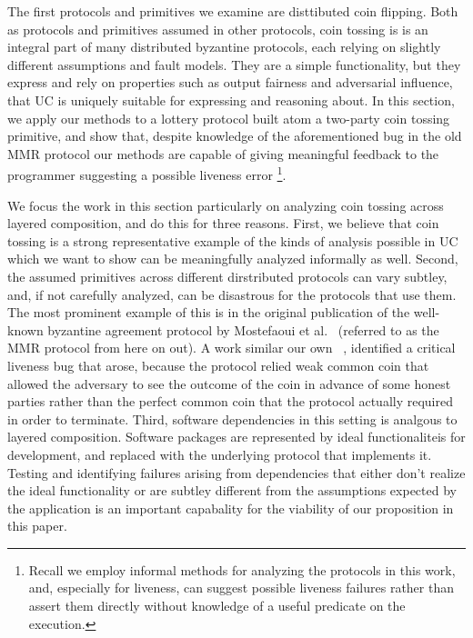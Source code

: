 The first protocols and primitives we examine are disttibuted coin flipping. 
Both as protocols and primitives assumed in other protocols, coin tossing is is an integral part of many distributed byzantine protocols, each relying on slightly different assumptions and fault models. 
They are a simple functionality, but they express and rely on properties such as output fairness and adversarial influence, that UC is uniquely suitable for expressing and reasoning about.
In this section, we apply our methods to a lottery protocol built atom a two-party coin tossing primitive, and show that, despite knowledge of the aforementioned bug in the old MMR protocol our methods are capable of giving meaningful feedback to the programmer suggesting a possible liveness error \footnote{Recall we employ informal methods for analyzing the protocols in this work, and, especially for liveness, can suggest possible liveness failures rather than assert them directly without knowledge of a useful predicate on the execution.}.

We focus the work in this section particularly on analyzing coin tossing across layered composition, and do this for three reasons. 
First, we believe that coin tossing is a strong representative example of the kinds of analysis possible in UC which we want to show can be meaningfully analyzed informally as well.
Second, the assumed primitives across different dirstributed protocols can vary subtley, and, if not carefully analyzed, can be disastrous for the protocols that use them.
The most prominent example of this is in the original publication of the well-known byzantine agreement protocol by  Mostefaoui et al.~\cite{mmrog} (referred to as the MMR protocol from here on out).
A work similar our own ~\cite{byzbymc}, identified a critical liveness bug that arose, because the protocol relied weak common coin that allowed the adversary to see the outcome of the coin in advance of some honest parties rather than the perfect common coin that the protocol actually required in order to terminate. 
Third, software dependencies in this setting is analgous to layered composition. 
Software packages are represented by ideal functionaliteis for development, and replaced with the underlying protocol that implements it.
Testing and identifying failures arising from dependencies that either don't realize the ideal functionality or are subtley different from the assumptions expected by the application is an important capabality for the viability of our proposition in this paper. 


